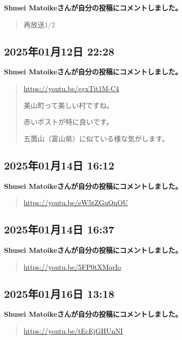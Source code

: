\textbf{Shusei Matoikeさんが自分の投稿にコメントしました。}

\begin{quote}
再放送1/2
\end{quote}

\subsection*{2025年01月12日 22:28}

\textbf{Shusei Matoikeさんが自分の投稿にコメントしました。}

\begin{quote}
\url{https://youtu.be/ggxTit1M-C4}

美山町って美しい村ですね。

赤いポストが特に良いです。

五箇山（富山県）に似ている様な気がします。
\end{quote}

\subsection*{2025年01月14日 16:12}

\textbf{Shusei Matoikeさんが自分の投稿にコメントしました。}

\begin{quote}
\url{https://youtu.be/eW5tZGuQnOU}
\end{quote}

\subsection*{2025年01月14日 16:37}

\textbf{Shusei Matoikeさんが自分の投稿にコメントしました。}

\begin{quote}
\url{https://youtu.be/5FP0tXMqrIo}
\end{quote}

\subsection*{2025年01月16日 13:18}

\textbf{Shusei Matoikeさんが自分の投稿にコメントしました。}

\begin{quote}
\url{https://youtu.be/tEcEjGHUnNI}
\end{quote}

